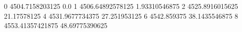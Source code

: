 0 4504.7158203125 0.0
1 4506.64892578125 1.93310546875
2 4525.8916015625 21.17578125
4 4531.9677734375 27.251953125
6 4542.859375 38.1435546875
8 4553.41357421875 48.69775390625
